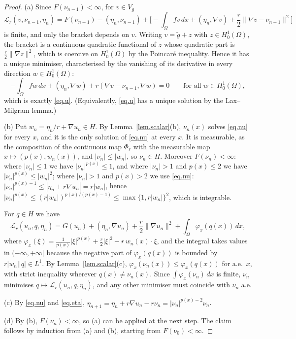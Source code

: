 \documentclass[11pt]{amsart}
\newcommand{\LL}{\mathcal L}
\newcommand{\dx}{\,dx}
\theoremstyle{definition}
\theoremstyle{remark}
\numberwithin{equation}{section}
\begin{document}
\begin{proof}
(a) Since $F(\nu_{n-1})<\infty$, for $v\in V_g$
$$
\LL_r(v,\nu_{n-1},\eta_n)=F(\nu_{n-1})-(\eta_n,\nu_{n-1})+\Big[-\int_\Omega fv\dx+(\eta_n,\nabla v)+\frac r2\|\nabla v-\nu_{n-1}\|^2\Big]
$$
is finite, and only the bracket depends on $v$. Writing $v=\tilde g+z$ with $z\in H^1_0(\Omega)$, the bracket is a continuous quadratic functional of $z$ whose quadratic part is $\frac r2\|\nabla z\|^2$, which is coercive on $H^1_0(\Omega)$ by the Poincar\'e inequality. Hence it has a unique minimiser, characterised by the vanishing of its derivative in every direction $w\in H^1_0(\Omega)$:
$$
-\int_\Omega fw\dx+(\eta_n,\nabla w)+r(\nabla v-\nu_{n-1},\nabla w)=0\qquad\text{for all }w\in H^1_0(\Omega),
$$
which is exactly \eqref{eq.u}. (Equivalently, \eqref{eq.u} has a unique solution by the Lax--Milgram lemma.)

(b) Put $w_n=\eta_n/r+\nabla u_n\in H$. By Lemma~\ref{lem.scalar}(b), $\nu_n(x)$ solves \eqref{eq.nu} for every $x$, and it is the only solution of \eqref{eq.nu} at every $x$. It is measurable, as the composition of the continuous map $\Phi_r$ with the measurable map $x\mapsto(p(x),w_n(x))$, and $|\nu_n|\le|w_n|$, so $\nu_n\in H$. Moreover $F(\nu_n)<\infty$: where $|\nu_n|\le1$ we have $|\nu_n|^{p(x)}\le1$, and where $|\nu_n|>1$ and $p(x)\le 2$ we have $|\nu_n|^{p(x)}\le|w_n|^2$; where $|\nu_n|>1$ and $p(x)>2$ we use \eqref{eq.nu}: $|\nu_n|^{p(x)-1}\le |\eta_n+r\nabla u_n|=r|w_n|$, hence $|\nu_n|^{p(x)}\le (r|w_n|)^{p(x)/(p(x)-1)}\le \max\{1,r|w_n|\}^{2}$, which is integrable.

For $q\in H$ we have
$$
\LL_r(u_n,q,\eta_n)=G(u_n)+(\eta_n,\nabla u_n)+\frac r2\|\nabla u_n\|^2+\int_\Omega\varphi_x(q(x))\dx,
$$
where $\varphi_x(\xi)=\frac1{p(x)}|\xi|^{p(x)}+\frac r2|\xi|^2-r\,w_n(x)\cdot\xi$, and the integral takes values in $(-\infty,+\infty]$ because the negative part of $\varphi_x(q(x))$ is bounded by $r|w_n||q|\in L^1$. By Lemma~\ref{lem.scalar}(c), $\varphi_x(\nu_n(x))\le\varphi_x(q(x))$ for a.e.\ $x$, with strict inequality wherever $q(x)\ne\nu_n(x)$. Since $\int\varphi_x(\nu_n)\dx$ is finite, $\nu_n$ minimises $q\mapsto\LL_r(u_n,q,\eta_n)$, and any other minimiser must coincide with $\nu_n$ a.e.

(c) By \eqref{eq.nu} and \eqref{eq.eta}, $\eta_{n+1}=\eta_n+r\nabla u_n-r\nu_n=|\nu_n|^{p(x)-2}\nu_n$.

(d) By (b), $F(\nu_n)<\infty$, so (a) can be applied at the next step. The claim follows by induction from (a) and (b), starting from $F(\nu_0)<\infty$.
\end{proof}
\end{document}
